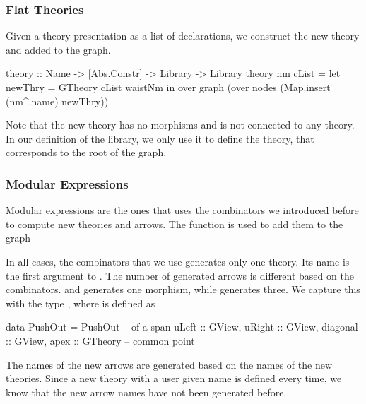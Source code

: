 \subsubsection{Flat Theories}
Given a theory presentation as a list of declarations, we construct the new theory and added to the graph. 
\begin{hscode}
theory :: Name -> [Abs.Constr] -> Library -> Library
theory nm cList =
  let newThry  = GTheory cList waistNm
  in  over graph (over nodes (Map.insert (nm^.name) newThry))
\end{hscode}
Note that the new theory has no morphisms and is not connected to any theory. In our definition of the library, we only use it to define the  theory, that corresponds to the root of the graph. 

\subsubsection{Modular Expressions}
Modular expressions are the ones that uses the combinators we introduced before to compute new theories and arrows. The function  is used to add them to the graph 
In all cases, the combinators that we use generates only one theory. Its name is the first argument to . The number of generated arrows is different based on the combinators.  and  generates one morphism, while  generates three. We capture this with the type , where  is defined as 
\begin{hscode}
data PushOut = PushOut { -- of a span
  uLeft    :: GView,
  uRight   :: GView,
  diagonal :: GView,
  apex     :: GTheory } -- common point
\end{hscode}
The names of the new arrows are generated based on the names of the new theories. Since a new theory with a user given name is defined every time, we know that the new arrow names have not been generated before. 

